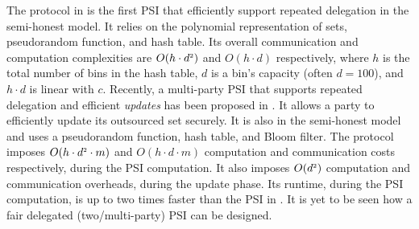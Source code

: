 The protocol in \cite{eopsi} is the first PSI that efficiently support repeated delegation in the semi-honest model. It relies on the polynomial representation of sets, pseudorandom function, and hash table. Its overall communication and computation complexities are $O(h\cdot d^{\scriptscriptstyle 2})$ and $O(h\cdot d)$ respectively, where $h$ is the total number of bins in the hash table, $d$ is a bin's capacity (often $d=100$), and $h\cdot d$ is linear with $c$.  
%
Recently, a multi-party PSI that supports repeated delegation and efficient \emph{updates} has been proposed in \cite{AbadiDMT22}. It allows a party to efficiently update its outsourced set securely. It is also in the semi-honest model and uses a pseudorandom function, hash table, and Bloom filter. The protocol imposes $O(h\cdot d^{\scriptscriptstyle 2}\cdot m)$ and $O(h\cdot d\cdot m)$  computation and communication costs respectively, during the PSI computation. It also imposes $O(d^{\scriptscriptstyle 2})$  computation and communication overheads, during the update phase.  Its runtime, during the PSI computation, is up to two times faster than the  PSI in \cite{eopsi}. It is yet to be seen how a fair delegated (two/multi-party) PSI can be designed.










 
 
 